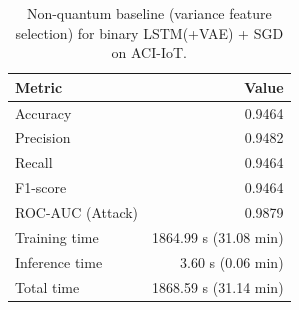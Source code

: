 \begin{table}[t]
\centering
\caption{Non-quantum baseline (variance feature selection) for binary LSTM(+VAE) + SGD on ACI-IoT.}
\label{tab:nonquantum_baseline}
\begin{tabular}{l r}
\hline
Metric & Value \\ \hline
Accuracy & 0.9464 \\ 
Precision & 0.9482 \\ 
Recall & 0.9464 \\ 
F1-score & 0.9464 \\ 
ROC-AUC (Attack) & 0.9879 \\ 
Training time & 1864.99 s (31.08 min) \\ 
Inference time & 3.60 s (0.06 min) \\ 
Total time & 1868.59 s (31.14 min) \\ 
\hline
\end{tabular}
\end{table}
